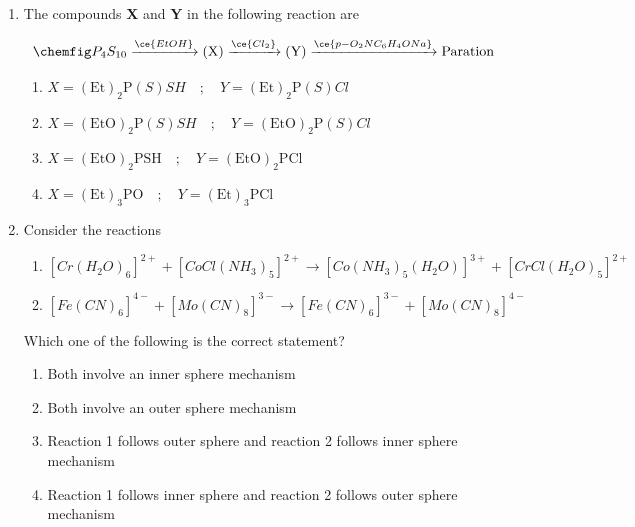 \documentclass[journal,12pt,onecolumn]{IEEEtran}
\theoremstyle{remark}
\begin{document}
\begin{enumerate}
\item The compounds \textbf{X} and \textbf{Y} in the following reaction are
\hfill{}

\[
\chemfig P_4S_{10} \xrightarrow{\ce{EtOH}} \text{(X)}
\xrightarrow{\ce{Cl_2}} \text{(Y)}
 \xrightarrow{\ce{p-O_2NC_6H_4ONa}} \text{Paration} 
\]


\begin{multicols}{2}
\begin{enumerate}[leftmargin=*, labelsep=1em]
     \item   $X = (\mathrm{Et})_2\mathrm{P}(S)SH \quad ; \quad Y = (\mathrm{Et})_2\mathrm{P}(S)Cl$
     \item   $X = (\mathrm{EtO})_2\mathrm{P}(S)SH \quad ; \quad Y = (\mathrm{EtO})_2\mathrm{P}(S)Cl$
     \item   $X = (\mathrm{EtO})_2\mathrm{PSH} \quad ; \quad Y = (\mathrm{EtO})_2\mathrm{PCl}$
     \item   $X = (\mathrm{Et})_3\mathrm{PO} \quad ; \quad Y = (\mathrm{Et})_3\mathrm{PCl}$
\end{enumerate}
\end{multicols}
 

\item Consider the reactions \hfill{}

\begin{enumerate}[label=\arabic*.]
\item \([Cr(H_2O)_6]^{2+} + [CoCl(NH_3)_5]^{2+} \rightarrow [Co(NH_3)_5(H_2O)]^{3+} + [CrCl(H_2O)_5]^{2+}\)
\item \([Fe(CN)_6]^{4-} + [Mo(CN)_8]^{3-} \rightarrow [Fe(CN)_6]^{3-} + [Mo(CN)_8]^{4-}\)
\end{enumerate}

Which one of the following is the correct statement?  

\begin{multicols}{2}
\begin{enumerate}[label=(\Alph*)]
 \item   Both involve an inner sphere mechanism  
 \item   Both involve an outer sphere mechanism  
 
 \item   Reaction 1 follows outer sphere and reaction 2 follows inner sphere mechanism  
 \item   Reaction 1 follows inner sphere and reaction 2 follows outer sphere mechanism  
\end{enumerate}
\end{multicols}
  


\end{enumerate}
\end{document}
